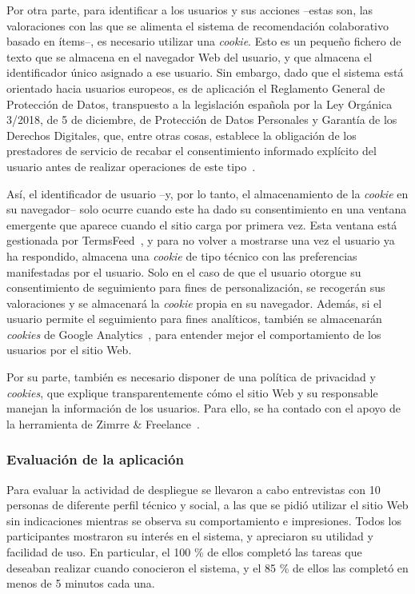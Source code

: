 Por otra parte, para identificar a los usuarios y sus acciones –estas son, las valoraciones con las que se alimenta el sistema de recomendación colaborativo basado en ítems–, es necesario utilizar una \textit{cookie}. Esto es un pequeño fichero de texto que se almacena en el navegador Web del usuario, y que almacena el identificador único asignado a ese usuario. Sin embargo, dado que el sistema está orientado hacia usuarios europeos, es de aplicación el Reglamento General de Protección de Datos, transpuesto a la legislación española por la Ley Orgánica 3/2018, de 5 de diciembre, de Protección de Datos Personales y Garantía de los Derechos Digitales, que, entre otras cosas, establece la obligación de los prestadores de servicio de recabar el consentimiento informado explícito del usuario antes de realizar operaciones de este tipo~\cite{GDPR_ESP}.

Así, el identificador de usuario –y, por lo tanto, el almacenamiento de la \textit{cookie} en su navegador– solo ocurre cuando este ha dado su consentimiento en una ventana emergente que aparece cuando el sitio carga por primera vez. Esta ventana está gestionada por TermsFeed~\cite{TermsFeed}, y para no volver a mostrarse una vez el usuario ya ha respondido, almacena una \textit{cookie} de tipo técnico con las preferencias manifestadas por el usuario. Solo en el caso de que el usuario otorgue su consentimiento de seguimiento para fines de personalización, se recogerán sus valoraciones y se almacenará la \textit{cookie} propia en su navegador. Además, si el usuario permite el seguimiento para fines analíticos, también se almacenarán \textit{cookies} de Google Analytics~\cite{analytics}, para entender mejor el comportamiento de los usuarios por el sitio Web.

Por su parte, también es necesario disponer de una política de privacidad y \textit{cookies}, que explique transparentemente cómo el sitio Web y su responsable manejan la información de los usuarios. Para ello, se ha contado con el apoyo de la herramienta de Zimrre \& Freelance~\cite{privacidad}.

\subsubsection{Evaluación de la aplicación}

Para evaluar la actividad de despliegue se llevaron a cabo entrevistas con 10 personas de diferente perfil técnico y social, a las que se pidió utilizar el sitio Web sin indicaciones mientras se observa su comportamiento e impresiones. Todos los participantes mostraron su interés en el sistema, y apreciaron su utilidad y facilidad de uso. En particular, el 100 \% de ellos completó las tareas que deseaban realizar cuando conocieron el sistema, y el 85 \% de ellos las completó en menos de 5 minutos cada una.

